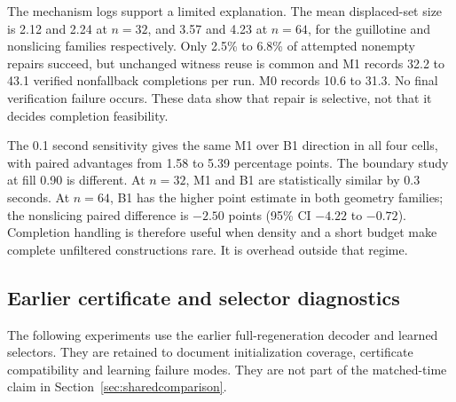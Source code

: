 \documentclass[preprint,12pt,authoryear]{elsarticle}
\begin{document}
The mechanism logs support a limited explanation. The mean displaced-set size
is 2.12 and 2.24 at $n=32$, and 3.57 and 4.23 at $n=64$, for the guillotine and
nonslicing families respectively. Only 2.5\% to 6.8\% of attempted nonempty
repairs succeed, but unchanged witness reuse is common and M1 records 32.2 to
43.1 verified nonfallback completions per run. M0 records 10.6 to 31.3. No final
verification failure occurs. These data show that repair is selective, not that
it decides completion feasibility.

The 0.1 second sensitivity gives the same M1 over B1 direction in all four
cells, with paired advantages from 1.58 to 5.39 percentage points. The boundary
study at fill 0.90 is different. At $n=32$, M1 and B1 are statistically similar
by 0.3 seconds. At $n=64$, B1 has the higher point estimate in both geometry
families; the nonslicing paired difference is $-2.50$ points (95\% CI $-4.22$
to $-0.72$). Completion handling is therefore useful when density and a short
budget make complete unfiltered constructions rare. It is overhead outside that
regime.

\subsection{Earlier certificate and selector diagnostics}
\label{sec:legacydiagnostics}

The following experiments use the earlier full-regeneration decoder and learned
selectors. They are retained to document initialization coverage, certificate
compatibility and learning failure modes. They are not part of the matched-time
claim in Section~\ref{sec:sharedcomparison}.
\end{document}
